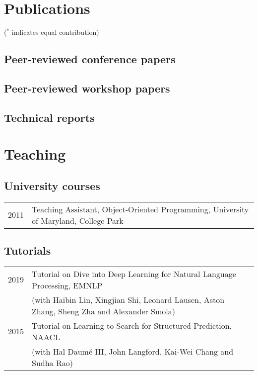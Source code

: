 \documentclass[a4paper,11pt]{article}
\begin{document}
\section{Publications}
($^*$ indicates equal contribution)
\subsection{Peer-reviewed conference papers}


\subsection{Peer-reviewed workshop papers}


\subsection{Technical reports}


\section{Teaching} 
\subsection{University courses}
\begin{tabular}{rl}
2011 & Teaching Assistant, Object-Oriented Programming, University of Maryland, College Park
\end{tabular}

\subsection{Tutorials}
\begin{tabular}{rl}
    2019 & Tutorial on Dive into Deep Learning for Natural Language Processing, EMNLP \\
         & (with Haibin Lin, Xingjian Shi, Leonard Lausen, Aston Zhang, Sheng Zha and Alexander Smola) \\
    2015 & Tutorial on Learning to Search for Structured Prediction, NAACL \\
         & (with Hal Daum\'e III, John Langford, Kai-Wei Chang and Sudha Rao)
\end{tabular}
\end{document}
